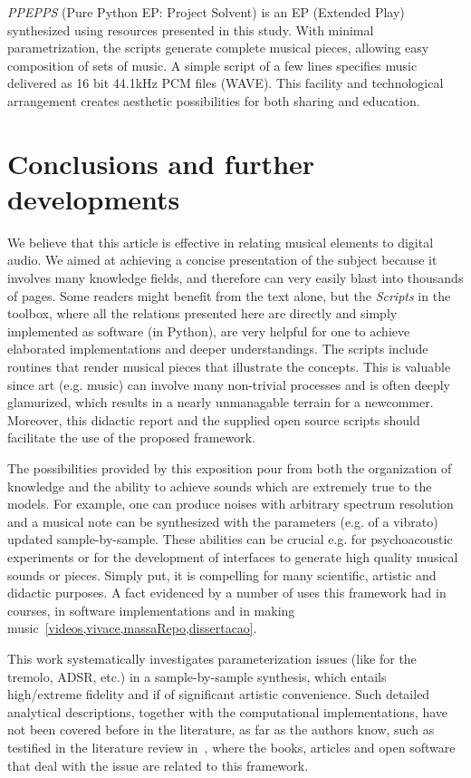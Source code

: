 \emph{PPEPPS} (Pure Python EP: Project Solvent) is an EP (Extended Play) synthesized using
resources presented in this study. With minimal parametrization, the scripts
generate complete musical pieces, allowing easy composition of sets of
music. A simple script of a few lines specifies music delivered as 16 bit
44.1kHz PCM files (WAVE). This facility and technological
arrangement creates aesthetic possibilities for both sharing and education.

\section{Conclusions and further developments}
\label{cap:conclusao}
We believe that this article is effective in relating musical elements to digital audio.
We aimed at achieving a concise presentation of the subject because it involves many knowledge fields, and therefore can very easily blast into thousands of pages.
Some readers might benefit from the text alone, but the \emph{Scripts} in the \massa toolbox, where all the relations presented here are directly and simply implemented as software (in Python), are very helpful for one to achieve elaborated implementations and deeper understandings.
The scripts include routines that render musical pieces that illustrate the concepts.
This is valuable since art (e.g. music) can involve many non-trivial processes and is often deeply glamurized, which results in a nearly unmanagable terrain for a newcommer.
Moreover, this didactic report and the supplied open source scripts should facilitate the use of the proposed framework.

The possibilities provided by this exposition pour from both the organization of knowledge and the ability to achieve sounds which are extremely true to the models.
For example, one can produce noises with arbitrary spectrum resolution and a musical note can be synthesized with the parameters (e.g. of a vibrato) updated sample-by-sample.
These abilities can be crucial e.g. for psychoacoustic experiments or for the development of
interfaces to generate high quality musical sounds or pieces.
Simply put, it is compelling
for many scientific, artistic and didactic purposes.
A fact evidenced by a number of uses this framework had in courses, in software implementations and in making music~\ref{videos,vivace,massaRepo,dissertacao}.

This work systematically investigates parameterization issues (like for the tremolo, ADSR, etc.) in a sample-by-sample synthesis, which entails high/extreme fidelity and if of significant artistic convenience. Such detailed analytical descriptions, together with the computational implementations, have not been covered before in the literature, as far as the authors know, such as testified in the literature review in~\cite{dissertacao}, where the books, articles and open software that deal with the issue are related to this framework.

